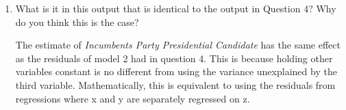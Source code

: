 \documentclass[12pt,letterpaper]{article}
\begin{document}
\begin{enumerate}
		\item What is it in this output that is identical to the output in Question 4? Why do you think this is the case?
		
		The estimate of \textit{Incumbents Party Presidential Candidate} has the same effect as the residuals of model 2 had in question 4. This is because holding other variables constant is no different from using the variance unexplained by the third variable. Mathematically, this is equivalent to using the residuals from regressions where x and y are separately regressed on z.
		
	\end{enumerate}
	
\end{document}
